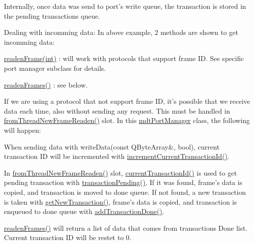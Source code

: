 Internally, once data was send to port's write queue, the transaction is stored in the pending transactions queue.

Dealing with incomming data\-: In above example, 2 methods are shown to get incomming data\-:
\begin{DoxyItemize}
\item \hyperlink{classmdt_port_manager_a830ae182d06dd6a52c43a7f45b9240ac}{readen\-Frame(int)} \-: will work with protocols that support frame I\-D. See specific port manager subclass for details.
\item \hyperlink{classmdt_port_manager_addd5dcae9644cea42a9871205af41796}{readen\-Frames()} \-: see below.
\end{DoxyItemize}

If we are using a protocol that not support frame I\-D, it's possible that we receive data each time, also without sending any request. This must be handled in \hyperlink{classmdt_port_manager_a4fcc8f0699b655156e661bb3de6056cc}{from\-Thread\-New\-Frame\-Readen()} slot. In this \hyperlink{classmdt_port_manager}{mdt\-Port\-Manager} class, the following will happen\-:
\begin{DoxyItemize}
\item When sending data with write\-Data(const Q\-Byte\-Array\&, bool), current transaction I\-D will be incremented with \hyperlink{classmdt_port_manager_a4d009936a0a5130f3bfecb69fee4ce42}{increment\-Current\-Transaction\-Id()}.
\item In \hyperlink{classmdt_port_manager_a4fcc8f0699b655156e661bb3de6056cc}{from\-Thread\-New\-Frame\-Readen()} slot, \hyperlink{classmdt_port_manager_a19abf29c8948cde0337d67c9722c25aa}{current\-Transaction\-Id()} is used to get pending transaction with \hyperlink{classmdt_port_manager_a18478707a9be7638b06cde48ced48297}{transaction\-Pending()}. If it was found, frame's data is copied, and transaction is moved to done queue. If not found, a new transaction is taken with \hyperlink{classmdt_port_manager_a75ebd3d1859e3ed38b9558981e53aac4}{get\-New\-Transaction()}, frame's data is copied, and transaction is enqueued to done queue with \hyperlink{classmdt_port_manager_a4b584d9005316be9991e6026e4c5e5a4}{add\-Transaction\-Done()}.
\item \hyperlink{classmdt_port_manager_addd5dcae9644cea42a9871205af41796}{readen\-Frames()} will return a list of data that comes from transactions Done list. Current transaction I\-D will be restet to 0.
\end{DoxyItemize}

